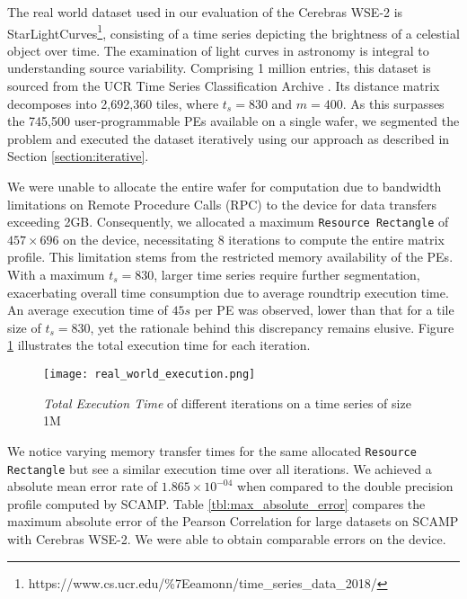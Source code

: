 The real world dataset used in our evaluation of the Cerebras WSE-2 is StarLightCurves\footnote{https://www.cs.ucr.edu/\%7Eeamonn/time\_series\_data\_2018/}, consisting of a time series depicting the brightness of a celestial object over time. The examination of light curves in astronomy is integral to understanding source variability. Comprising 1 million entries, this dataset is sourced from the UCR Time Series Classification Archive \cite{UCRArchive2018}. Its distance matrix decomposes into 2,692,360 tiles, where $t_s = 830$ and $m = 400$. As this surpasses the 745,500 user-programmable PEs available on a single wafer, we segmented the problem and executed the dataset iteratively using our approach as described in Section \ref{section:iterative}.

We were unable to allocate the entire wafer for computation due to bandwidth limitations on Remote Procedure Calls (RPC) to the device for data transfers exceeding 2GB. Consequently, we allocated a maximum \texttt{Resource Rectangle} of $457 \times 696$ on the device, necessitating 8 iterations to compute the entire matrix profile. This limitation stems from the restricted memory availability of the PEs. With a maximum $t_s = 830$, larger time series require further segmentation, exacerbating overall time consumption due to average roundtrip execution time. An average execution time of $45s$ per PE was observed, lower than that for a tile size of $t_s = 830$, yet the rationale behind this discrepancy remains elusive. Figure \ref{fig:real_world_execution} illustrates the total execution time for each iteration.

\begin{figure}[h!]
    \texttt{[image: real\_world\_execution.png]}
    \centering
    \caption{\textit{Total Execution Time} of different iterations on a time series of size 1M}
    \label{fig:real_world_execution}
\end{figure}

We notice varying memory transfer times for the same allocated \texttt{Resource Rectangle} but see a similar execution time over all iterations. We achieved a absolute mean error rate of $1.865 \times 10^{-04}$ when compared to the double precision profile computed by SCAMP. Table \ref{tbl:max_absolute_error} compares the maximum absolute error of the Pearson Correlation for large datasets on SCAMP with Cerebras WSE-2. We were able to obtain comparable errors on the device.


